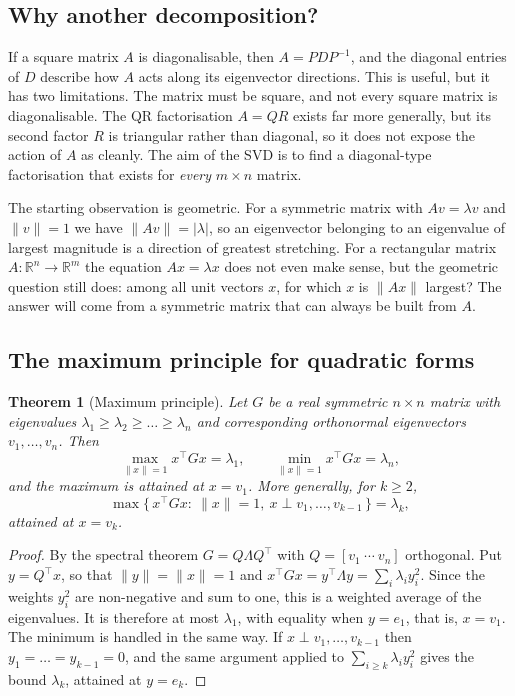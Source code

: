 \documentclass[12pt,a4paper]{report}
\newcommand{\R}{\mathbb{R}}
\newcommand{\norm}[1]{\lVert #1\rVert}
\newcommand{\T}{^{\top}}
\theoremstyle{plain}
\newtheorem{theorem}{Theorem}[chapter]
\theoremstyle{definition}
\theoremstyle{remark}
\theoremstyle{definition}
\begin{document}
\subsection{Why another decomposition?}

If a square matrix $A$ is diagonalisable, then $A=PDP^{-1}$, and the diagonal entries of $D$ describe how $A$ acts along its eigenvector directions. This is useful, but it has two limitations. The matrix must be square, and not every square matrix is diagonalisable. The QR factorisation $A=QR$ exists far more generally, but its second factor $R$ is triangular rather than diagonal, so it does not expose the action of $A$ as cleanly. The aim of the SVD is to find a diagonal-type factorisation that exists for \emph{every} $m\times n$ matrix.

The starting observation is geometric. For a symmetric matrix with $Av=\lambda v$ and $\norm{v}=1$ we have $\norm{Av}=|\lambda|$, so an eigenvector belonging to an eigenvalue of largest magnitude is a direction of greatest stretching. For a rectangular matrix $A:\R^n\to\R^m$ the equation $Ax=\lambda x$ does not even make sense, but the geometric question still does: among all unit vectors $x$, for which $x$ is $\norm{Ax}$ largest? The answer will come from a symmetric matrix that can always be built from $A$.

\subsection{The maximum principle for quadratic forms}

\begin{theorem}[Maximum principle]\label{thm:maxprinciple}
Let $G$ be a real symmetric $n\times n$ matrix with eigenvalues $\lambda_1\ge\lambda_2\ge\dots\ge\lambda_n$ and corresponding orthonormal eigenvectors $v_1,\dots,v_n$. Then
\[
\max_{\norm{x}=1} x\T G x=\lambda_1,
\qquad
\min_{\norm{x}=1} x\T G x=\lambda_n,
\]
and the maximum is attained at $x=v_1$. More generally, for $k\ge 2$,
\[
\max\{\,x\T Gx:\ \norm{x}=1,\ x\perp v_1,\dots,v_{k-1}\,\}=\lambda_k ,
\]
attained at $x=v_k$.
\end{theorem}

\begin{proof}
By the spectral theorem $G=Q\Lambda Q\T$ with $Q=[v_1\ \cdots\ v_n]$ orthogonal. Put $y=Q\T x$, so that $\norm{y}=\norm{x}=1$ and $x\T Gx=y\T\Lambda y=\sum_{i}\lambda_i y_i^2$. Since the weights $y_i^2$ are non-negative and sum to one, this is a weighted average of the eigenvalues. It is therefore at most $\lambda_1$, with equality when $y=e_1$, that is, $x=v_1$. The minimum is handled in the same way. If $x\perp v_1,\dots,v_{k-1}$ then $y_1=\dots=y_{k-1}=0$, and the same argument applied to $\sum_{i\ge k}\lambda_iy_i^2$ gives the bound $\lambda_k$, attained at $y=e_k$.
\end{proof}
\end{document}
